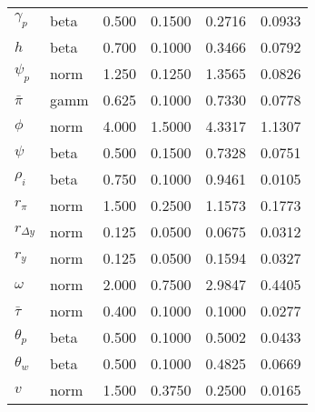 \begin{center}
\begin{longtable}{llcccc}
${\gamma_p}$ & beta &   0.500 & 0.1500 &   0.2716 &  0.0933 \\ 
${h}$ & beta &   0.700 & 0.1000 &   0.3466 &  0.0792 \\ 
${\psi_p}$ & norm &   1.250 & 0.1250 &   1.3565 &  0.0826 \\ 
${\bar{\pi}}$ & gamm &   0.625 & 0.1000 &   0.7330 &  0.0778 \\ 
${\phi}$ & norm &   4.000 & 1.5000 &   4.3317 &  1.1307 \\ 
${\psi}$ & beta &   0.500 & 0.1500 &   0.7328 &  0.0751 \\ 
${\rho_{i}}$ & beta &   0.750 & 0.1000 &   0.9461 &  0.0105 \\ 
${r_{\pi}}$ & norm &   1.500 & 0.2500 &   1.1573 &  0.1773 \\ 
${r_{\Delta y}}$ & norm &   0.125 & 0.0500 &   0.0675 &  0.0312 \\ 
${r_{y}}$ & norm &   0.125 & 0.0500 &   0.1594 &  0.0327 \\ 
${\omega}$ & norm &   2.000 & 0.7500 &   2.9847 &  0.4405 \\ 
${\bar{\tau}}$ & norm &   0.400 & 0.1000 &   0.1000 &  0.0277 \\ 
${\theta_p}$ & beta &   0.500 & 0.1000 &   0.5002 &  0.0433 \\ 
${\theta_w}$ & beta &   0.500 & 0.1000 &   0.4825 &  0.0669 \\ 
${v}$ & norm &   1.500 & 0.3750 &   0.2500 &  0.0165 \\ 
\end{longtable}
 \end{center}
